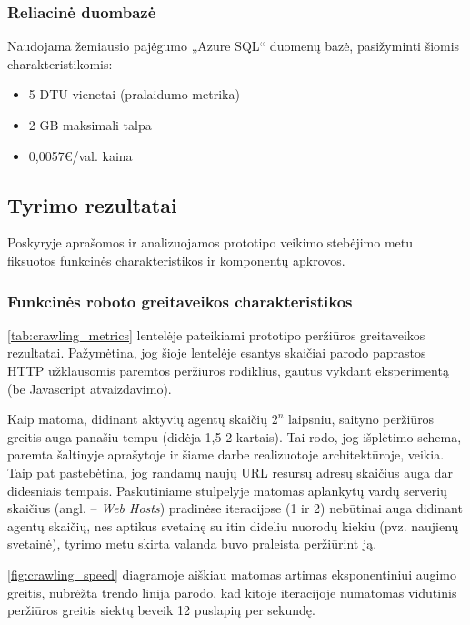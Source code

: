 \subsubsection{Reliacinė duombazė}

Naudojama žemiausio pajėgumo „Azure SQL“ duomenų bazė, pasižyminti šiomis charakteristikomis:

\begin{itemize}
    \item 5 DTU vienetai (pralaidumo metrika)
    \item 2 GB maksimali talpa
    \item 0,0057€/val. kaina
\end{itemize}

\subsection{Tyrimo rezultatai}

Poskyryje aprašomos ir analizuojamos prototipo veikimo stebėjimo metu fiksuotos funkcinės charakteristikos ir komponentų apkrovos.

\subsubsection{Funkcinės roboto greitaveikos charakteristikos}

\ref{tab:crawling_metrics} lentelėje pateikiami prototipo peržiūros greitaveikos rezultatai. Pažymėtina, jog šioje lentelėje esantys skaičiai parodo  paprastos HTTP užklausomis paremtos peržiūros rodiklius, gautus vykdant eksperimentą (be Javascript atvaizdavimo). 

Kaip matoma, didinant aktyvių agentų skaičių ${2^n}$ laipsniu, saityno peržiūros greitis auga panašiu tempu (didėja 1,5-2 kartais). Tai rodo, jog išplėtimo schema, paremta \cite{MercedCloudBasedWebCrawler} šaltinyje aprašytoje ir šiame darbe realizuotoje architektūroje, veikia. Taip pat pastebėtina, jog randamų naujų URL resursų adresų skaičius auga dar didesniais tempais. Paskutiniame stulpelyje matomas aplankytų vardų serverių skaičius (angl. -- \textit{Web Hosts}) pradinėse iteracijose (1 ir 2) nebūtinai auga didinant agentų skaičių, nes aptikus svetainę su itin dideliu nuorodų kiekiu (pvz. naujienų svetainė), tyrimo metu skirta valanda buvo praleista peržiūrint ją.





\ref{fig:crawling_speed} diagramoje aiškiau matomas artimas eksponentiniui augimo greitis, nubrėžta trendo linija parodo, kad kitoje iteracijoje numatomas vidutinis peržiūros greitis siektų beveik 12 puslapių per sekundę.

